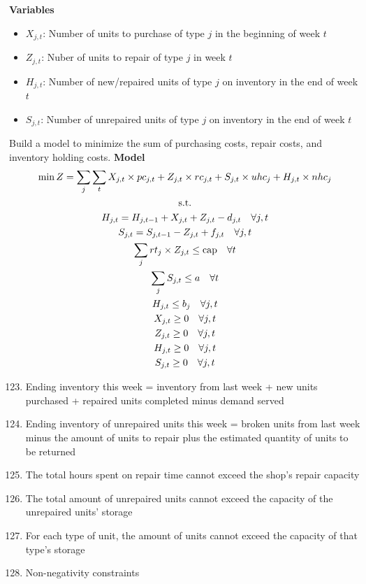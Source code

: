 \documentclass[10pt]{article}
\begin{document}
\textbf{Variables}
\begin{itemize}
    \item $X_{j, t} $: Number of units to purchase of type $j $ in the beginning of week $ t $
    \item $Z_{j, t} $: Nuber of units to repair of type $j $ in week $ t $
    \item $H_{j, t} $: Number of new/repaired units of type $j $ on inventory in the end of week $t $
    \item $S_{j, t} $: Number of unrepaired units of type $j $ on inventory in the end of week $t $
\end{itemize}

Build a model to minimize the sum of purchasing costs, repair costs, and inventory holding costs.
\newpage 
\textbf{Model}
\begin{gather}
    \min Z = \sum_{j}\sum_tX_{j, t}\times pc_{j, t} + Z_{j, t}\times rc_{j, t} + S_{j, t}\times uhc_j + H_{j, t}\times nhc_j\notag\\
    \text{s.t.}\notag\\
    H_{j, t} = H_{j, t - 1} + X_{j, t} + Z_{j, t} - d_{j, t} \quad\forall j, t\\
    S_{j, t} = S_{j, t - 1} - Z_{j, t} + f_{j, t}\quad\forall j, t\\
    \sum_j rt_j\times Z_{j, t} \le \text{cap}\quad\forall t\\
    \sum_j S_{j, t} \le a\quad\forall t\\
    H_{j, t} \le b_j\quad\forall j, t\\
    X_{j, t} \ge 0\quad\forall j, t\\
    Z_{j, t} \ge 0\quad\forall j, t\\
    H_{j, t} \ge 0\quad\forall j, t\\
    S_{j, t} \ge 0\quad\forall j, t
\end{gather}
\begin{enumerate}
    \setcounter{enumi}{122}
    \item Ending inventory this week = inventory from last week + new units purchased + repaired units completed minus demand served 
    \item Ending inventory of unrepaired units this week = broken units from last week minus the amount of units to repair plus the estimated quantity of units to be returned 
    \item The total hours spent on repair time cannot exceed the shop's repair capacity
    \item The total amount of unrepaired units cannot exceed the capacity of the unrepaired units' storage 
    \item For each type of unit, the amount of units cannot exceed the capacity of that type's storage 
    \item Non-negativity constraints 
\end{enumerate}
\newpage 
\end{document}
